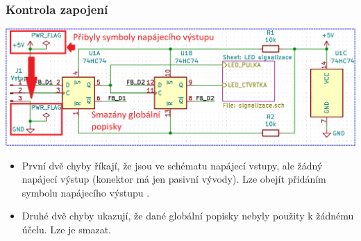 \documentclass{beamer}
\begin{document}
\begin{frame}
	\frametitle{Kontrola zapojení}
	
	\begin{center}
		\includegraphics[width=\textwidth]{obr/kontrola05.png}
	\end{center}
	
	\small
	
	\begin{itemize}
		\item První dvě chyby říkají, že jsou ve schématu napájecí vstupy, ale žádný napájecí výstup (konektor má jen pasivní vývody). Lze obejít přidáním symbolu napájecího výstupu .
		\item Druhé dvě chyby ukazují, že dané globální popisky nebyly použity k žádnému účelu. Lze je smazat.
	\end{itemize}
	
\end{frame}
\end{document}
